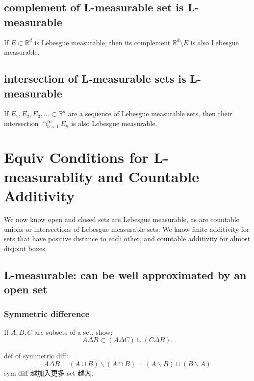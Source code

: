 \documentclass[lang=cn,11pt]{template}
\begin{document}
\section{complement of L-measurable set is L-measurable} 
\begin{theorem}
If \( E \subset \mathbb{R}^d \) is Lebesgue measurable, then its complement \( \mathbb{R}^d \setminus E \) is also Lebesgue measurable.
\end{theorem}


\section{intersection of L-measurable sets is L-measurable}
\begin{theorem}
If \( E_1, E_2, E_3, \ldots \subset \mathbb{R}^d \) are a sequence of Lebesgue measurable sets, then their intersection \( \cap_{n=1}^{\infty} E_n \) is also Lebesgue measurable.
\end{theorem}




\chapter{Equiv Conditions for L-measurablity and Countable Additivity}
\begin{remark}
We now know open and closed sets are Lebesgue measurable, as are countable unions or intersections of Lebesgue measurable sets. 
We know finite additivity for sets that have positive distance to each other, and countable additivity for almost disjoint boxes.
\end{remark}



\section{L-measurable: can be well approximated by an open set}


\subsection{Symmetric difference}
If \( A, B, C \) are subsets of a set, show:
\[
A \Delta B \subset (A \Delta C) \cup (C \Delta B).
\]
\begin{remark}
def of symmetric diff: 
$$
A \Delta B =( A \cup B ) \backslash (A \cap B) = (A \backslash B) \cup (B\backslash A)
$$
sym diff 越加入更多 set 越大.
\end{remark}
\end{document}
